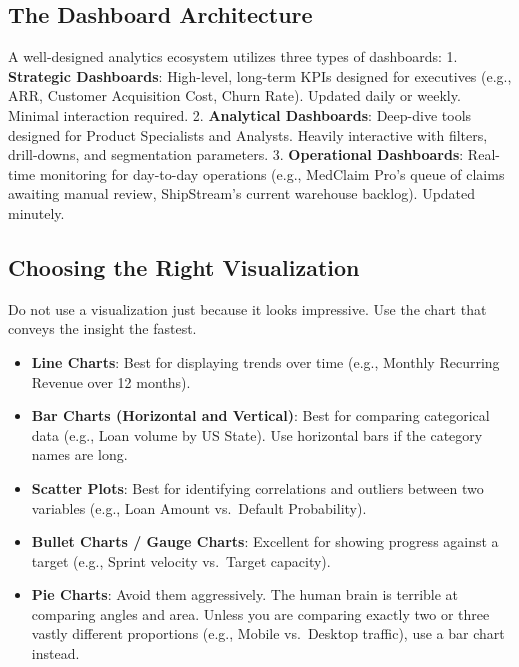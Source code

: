 \subsection{The Dashboard
Architecture}\label{the-dashboard-architecture}

A well-designed analytics ecosystem utilizes three types of dashboards:
1. \textbf{Strategic Dashboards}: High-level, long-term KPIs designed
for executives (e.g., ARR, Customer Acquisition Cost, Churn Rate).
Updated daily or weekly. Minimal interaction required. 2.
\textbf{Analytical Dashboards}: Deep-dive tools designed for Product
Specialists and Analysts. Heavily interactive with filters, drill-downs,
and segmentation parameters. 3. \textbf{Operational Dashboards}:
Real-time monitoring for day-to-day operations (e.g., MedClaim Pro's
queue of claims awaiting manual review, ShipStream's current warehouse
backlog). Updated minutely.

\subsection{Choosing the Right
Visualization}\label{choosing-the-right-visualization}

Do not use a visualization just because it looks impressive. Use the
chart that conveys the insight the fastest.

\begin{itemize}
\tightlist
\item
  \textbf{Line Charts}: Best for displaying trends over time (e.g.,
  Monthly Recurring Revenue over 12 months).
\item
  \textbf{Bar Charts (Horizontal and Vertical)}: Best for comparing
  categorical data (e.g., Loan volume by US State). Use horizontal bars
  if the category names are long.
\item
  \textbf{Scatter Plots}: Best for identifying correlations and outliers
  between two variables (e.g., Loan Amount vs.~Default Probability).
\item
  \textbf{Bullet Charts / Gauge Charts}: Excellent for showing progress
  against a target (e.g., Sprint velocity vs.~Target capacity).
\item
  \textbf{Pie Charts}: Avoid them aggressively. The human brain is
  terrible at comparing angles and area. Unless you are comparing
  exactly two or three vastly different proportions (e.g., Mobile
  vs.~Desktop traffic), use a bar chart instead.
\end{itemize}

